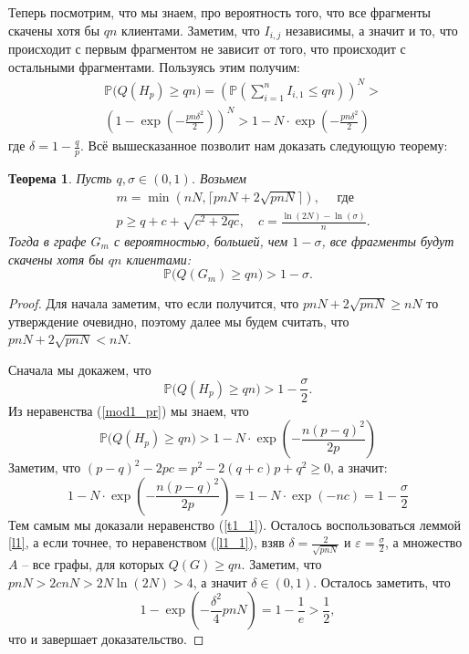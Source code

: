 \documentclass{matmex-diploma-custom}
\newcommand{\PRob}{\mathbb P}
\newcommand{\leqs}{\leqslant}
\newcommand{\geqs}{\geqslant}
\newcommand{\eps}{\varepsilon}
\newtheorem{theorem}{Теорема}
\theoremstyle{named}
\begin{document}
Теперь посмотрим, что мы знаем, про вероятность того, что все фрагменты скачены хотя бы $qn$ клиентами.
Заметим, что $I_{i,j}$ независимы, а значит и то, что происходит с первым фрагментом не зависит от того, 
что происходит с остальными фрагментами. Пользуясь этим получим:
\begin{equation}\label{mod1_pr}\begin{aligned}
&\PRob\big(Q(H_p) \geqs q n\big) = \left( \PRob\left(\sum_{i=1}^n I_{i,1} \leqs qn\right)  \right)^N >
\\
&\left( 1 - \exp\left(- \frac{pn \delta^2}{2} \right) \right)^N > 1 - N \cdot \exp\left(- \frac{pn \delta^2}{2} \right) 
\end{aligned}\end{equation}
где $\delta = 1 - \frac{q}{p}$. Всё вышесказанное позволит нам доказать следующую теорему:

\begin{theorem}\label{t1}
Пусть $q, \sigma \in (0, 1)$. Возьмем 
\begin{align}
& m = \min(nN, \lceil pnN + 2\sqrt{pnN} \rceil), \quad \text{ где} \\
& p \geqs q + c + \sqrt{c^2+2qc}, \quad c = \frac{\ln(2N) - \ln(\sigma)}{n}.
\end{align}
Тогда в графе $G_m$ с вероятностью, большей, чем $1 - \sigma$, все фрагменты будут скачены хотя бы $qn$ клиентами:
\begin{equation}
\PRob\big(Q(G_m) \geqs qn\big) > 1 - \sigma.
\end{equation}
\end{theorem}

\begin{proof}
Для начала заметим, что если получится, что $pnN + 2\sqrt{pnN} \geqs nN$ то утверждение очевидно, 
поэтому далее мы будем считать, что $pnN + 2\sqrt{pnN} < nN$.

Сначала мы докажем, что 
\begin{equation}\label{t1_1}
\PRob\big(Q(H_p) \geqs qn \big) > 1 - \frac\sigma{2}.
\end{equation}
Из неравенства (\ref{mod1_pr}) мы знаем, что 
\begin{equation} \label{t1_t3_1}
\PRob\big(Q(H_p) \geqs qn \big) > 1 - N \cdot \exp\left(- \frac{n (p-q)^2}{2p} \right)
\end{equation}
Заметим, что $(p-q)^2 - 2pc = p^2 -2(q + c)p + q^2 \geqs 0$, а значит:
\begin{equation}
1 - N \cdot \exp\left(- \frac{n (p-q)^2}{2p} \right) = 1 - N \cdot \exp(-nc) = 1 - \frac\sigma{2}
\end{equation}
Тем самым мы доказали неравенство (\ref{t1_1}).
Осталось воспользоваться леммой \ref{l1}, а если точнее, то неравенством (\ref{l1_1}), взяв $\delta = \frac{2}{\sqrt{pnN}}$
 и $\eps = \frac\sigma{2}$, а множество $A$ -- все графы, для которых $Q(G) \geqs qn$.
Заметим, что $pnN > 2cnN> 2N\ln(2N) > 4$, а значит $\delta \in (0,1)$. Осталось заметить, что 
\begin{equation}
1 - \exp\left(-\frac{\delta^2}{4}pnN\right) = 1 - \frac{1}{e} > \frac{1}{2},
\end{equation}
что и завершает доказательство.
\end{proof}
\end{document}
